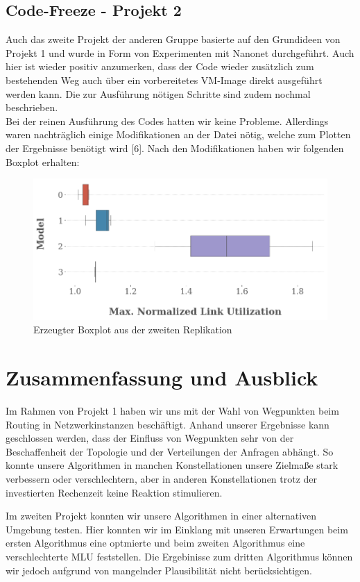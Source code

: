 \documentclass[sigconf,noacm,review]{acmart}
\begin{document}
\subsection{Code-Freeze - Projekt 2}
Auch das zweite Projekt der anderen Gruppe basierte auf den Grundideen von Projekt 1 und wurde in Form von Experimenten mit Nanonet durchgeführt. Auch hier ist wieder positiv anzumerken, dass der Code wieder zusätzlich zum bestehenden Weg auch über ein vorbereitetes VM-Image direkt ausgeführt werden kann. Die zur Ausführung nötigen Schritte sind zudem nochmal beschrieben. \\
Bei der reinen Ausführung des Codes hatten wir keine Probleme. Allerdings waren nachträglich einige Modifikationen an der Datei nötig, welche zum Plotten der Ergebnisse benötigt wird [6]. Nach den Modifikationen haben wir folgenden Boxplot erhalten: 
\begin{figure}[h]
  \centering
  \includegraphics[width=\linewidth]{abbildungen/boxplot}
  \caption{Erzeugter Boxplot aus der zweiten Replikation}
\end{figure}

\section{Zusammenfassung und Ausblick}
Im Rahmen von Projekt 1 haben wir uns mit der Wahl von Wegpunkten beim Routing in Netzwerkinstanzen beschäftigt. Anhand unserer Ergebnisse kann geschlossen werden, dass der Einfluss von Wegpunkten sehr von der Beschaffenheit der Topologie und der Verteilungen der Anfragen abhängt. So konnte unsere Algorithmen in manchen Konstellationen unsere Zielmaße stark verbessern oder verschlechtern, aber in anderen Konstellationen trotz der investierten Rechenzeit keine Reaktion stimulieren.

Im zweiten Projekt konnten wir unsere Algorithmen in einer alternativen Umgebung testen. Hier konnten wir im Einklang mit unseren Erwartungen beim ersten Algorithmus eine optmierte und beim zweiten Algorithmus eine verschlechterte MLU feststellen. Die Ergebinisse zum dritten Algorithmus können wir jedoch aufgrund von mangelnder Plausibilität nicht berücksichtigen.
\end{document}

